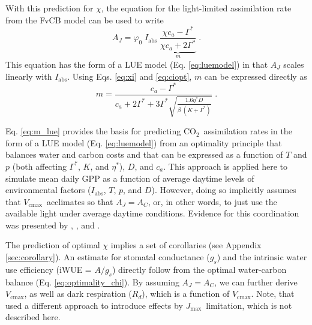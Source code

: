 \documentclass{myreport}
\newcommand{\coo}{CO$_2$}
\newcommand{\vcmax}{$V_{\text{cmax}}$}
\newcommand{\jmax}{$J_{\text{max}}$}
\begin{document}
With this prediction for $\chi$, the equation for the light-limited assimilation rate from the FvCB model can be used to write
\begin{equation}
\label{eq:aj}
        A_J = \varphi_0 \; I_{\mathrm{abs}}\;\underbrace{\frac{\chi c_a - \Gamma^{\ast}}{\chi c_a + 2\Gamma^{\ast}}}_{m} \;.
\end{equation}
This equation has the form of a LUE model (Eq. \ref{eq:luemodel}) in that $A_J$ scales linearly with $I_{\mathrm{abs}}$. Using Eqs. \ref{eq:xi} and \ref{eq:ciopt}, $m$ can be expressed directly as
\begin{equation}
\label{eq:m_lue}
    m = \frac{c_a - \Gamma^{\ast}}{c_a + 2 \Gamma^{\ast} + 3 \Gamma^{\ast} \sqrt{\frac{1.6 \eta^{\ast} D }{\beta\;(K+\Gamma^{\ast})}}} \;.
\end{equation}

Eq. \ref{eq:m_lue} provides the basis for predicting \coo\ assimilation rates in the form of a LUE model (Eq. \ref{eq:luemodel}) from an optimality principle that balances water and carbon costs and that can be expressed as a function of $T$ and $p$ (both affecting $\Gamma^{\ast}$, $K$, and $\eta^\ast$), $D$, and $c_a$. This approach is applied here to simulate mean daily GPP as a function of average daytime levels of environmental factors ($I_{\mathrm{abs}}$, $T$, $p$, and $D$). However, doing so implicitly assumes that \vcmax\ acclimates so that $A_J=A_C$, or, in other words, to just use the available light under average daytime conditions. Evidence for this coordination was presented by \cite{chen93}, \cite{haxeltine96}, and \cite{maire12po}. 

The prediction of optimal $\chi$ implies a set of corollaries (see Appendix \ref{sec:corollary}). An estimate for stomatal conductance ($g_s$) and the intrinsic water use efficiency (iWUE = $A/g_s$) directly follow from the optimal water-carbon balance (Eq. \ref{eq:optimality_chi}). By assuming $A_J=A_C$, we can further derive \vcmax , as well as dark respiration ($R_d$), which is a function of \vcmax . Note, that \cite{smith19ecollett} used a different approach to introduce effects by \jmax\ limitation, which is not described here.
\end{document}
